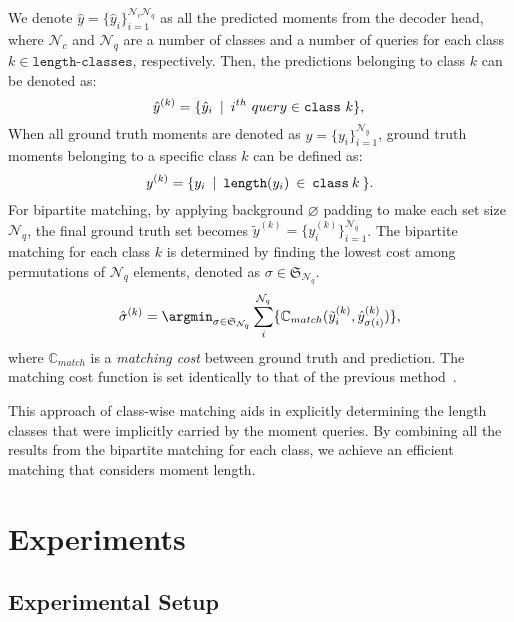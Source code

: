 We denote $\hat y = \{\hat y_i \}^{\mathcal{N}_c \mathcal{N}_q}_{i=1}$ as all the predicted moments from the decoder head, where $\mathcal{N}_c$ and $\mathcal{N}_q$ are a number of classes and a number of queries for each class $k \in \texttt{length-classes}$, respectively.
Then, the predictions belonging to class $k$ can be denoted as:
\begin{equation}
    \label{equation_ground_truth}
    \hat y^{(k)}  = \{\hat y_i \: \mid \: i^{th}\ query \in \texttt{class}\ k \}, \\
\end{equation}
When all ground truth moments are denoted as \(y = \{y_i\}^{\mathcal{N}_y}_{i=1}\), ground truth moments belonging to a specific class $k$ can be defined as:
\begin{equation}
    \label{equation_ground_truth2}
    y^{(k)} = \{ y_i \: \mid \:  \texttt{length}(y_i)  \: \in \: \texttt{class} \: k \: \}. \\
\end{equation}
For bipartite matching, by applying background \(\varnothing\) padding to make each set size $\mathcal{N}_q$, the final ground truth set becomes $\tilde y^{(k)} = \{{y_i^{(k)}}\}_{i=1}^{\mathcal{N}_q}$. 
The bipartite matching for each class $k$ is determined by finding the lowest cost among permutations of $\mathcal{N}_q$ elements, denoted as $\sigma \in {\mathfrak{S}}_{\mathcal{N}_q}$.
\begin{equation}
    \label{equation_ground_truth3}
    \hat \sigma^{(k)} = \argmin_{\sigma \in {\mathfrak{S}}_{\mathcal{N}_q}} \sum_{i}^{\mathcal{N}_q} \{ {{\mathbb{C}_{match}} (\tilde y^{(k)}_i, \hat y^{(k)}_{\sigma(i)})} \},
\end{equation}  where \({\mathbb{C}_{match}}\) is a \textit{matching cost} between ground truth and prediction. The matching cost function is set identically to that of the previous method~\cite{lei2021detecting_Moment-DETR}. 

This approach of class-wise matching aids in explicitly determining the length classes that were implicitly carried by the moment queries. By combining all the results from the bipartite matching for each class, we achieve an efficient matching that considers moment length.

\section{Experiments}
\label{sec:experiments}

\subsection{Experimental Setup}
\label{sec:experiment_setup}


